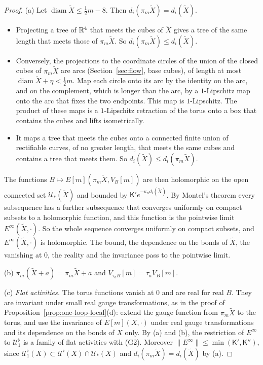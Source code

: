 \begin{proof}
(a) Let $\operatorname{diam}\tilde X\le\frac12m-8$. Then $d_i(\pi_m\tilde X)=d_i(\tilde X)$.
\begin{itemize}
\item Projecting a tree of $\mathbb R^4$ that meets the cubes of $\tilde X$ gives a tree of the same length that meets those of $\pi_m\tilde X$. So $d_i(\pi_m\tilde X)\le d_i(\tilde X)$.
\item Conversely, the projections to the coordinate circles of the union of the closed cubes of $\pi_m\tilde X$ are arcs (Section~\ref{sec:flow}, base cubes), of length at most $\operatorname{diam}\tilde X+\eta<\frac12m$. Map each circle onto its arc by the identity on the arc, and on the complement, which is longer than the arc, by a $1$-Lipschitz map onto the arc that fixes the two endpoints. This map is $1$-Lipschitz. The product of these maps is a $1$-Lipschitz retraction of the torus onto a box that contains the cubes and lifts isometrically.
\item It maps a tree that meets the cubes onto a connected finite union of rectifiable curves, of no greater length, that meets the same cubes and contains a tree that meets them. So $d_i(\tilde X)\le d_i(\pi_m\tilde X)$.
\end{itemize}
The functions $B\mapsto E[m](\pi_m\tilde X,V_B[m])$ are then holomorphic on the open connected set $\mathcal U_*(\tilde X)$ and bounded by $\mathsf K'e^{-\kappa_nd_i(\tilde X)}$. By Montel's theorem every subsequence has a further subsequence that converges uniformly on compact subsets to a holomorphic function, and this function is the pointwise limit $E^\infty(\tilde X,\cdot)$. So the whole sequence converges uniformly on compact subsets, and $E^\infty(\tilde X,\cdot)$ is holomorphic. The bound, the dependence on the bonds of $\tilde X$, the vanishing at $0$, the reality and the invariance pass to the pointwise limit.

(b) $\pi_m(\tilde X+a)=\pi_m\tilde X+a$ and $V_{\tau_aB}[m]=\tau_aV_B[m]$.

(c) \emph{Flat activities.} The torus functions vanish at $0$ and are real for real $B$. They are invariant under small real gauge transformations, as in the proof of Proposition~\ref{prop:one-loop-local}(d): extend the gauge function from $\pi_m\tilde X$ to the torus, and use the invariance of $E[m](X,\cdot)$ under real gauge transformations and its dependence on the bonds of $X$ only. By (a) and (b), the restriction of $E^\infty$ to $\mathcal U^\flat_1$ is a family of flat activities with (G2). Moreover $\|E^\infty\|\le\min(\mathsf K',\mathsf K'')$, since $\mathcal U^\flat_1(X)\subset\mathcal U^\flat(X)\cap\mathcal U_*(X)$ and $d_i(\pi_m\tilde X)=d_i(\tilde X)$ by (a).


\end{proof}
